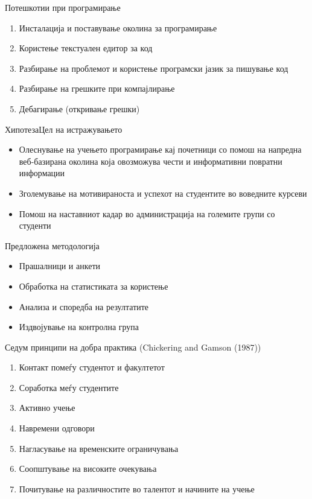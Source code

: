 \begin{frame}{Потешкотии при програмирање}
\begin{enumerate}
  \item Инсталација и поставување околина за програмирање 
  \item Користење текстуален едитор за код
  \item Разбирање на проблемот и користење програмски јазик за пишување код
  \item Разбирање на грешките при компајлирање
  \item Дебагирање (откривање грешки)
\end{enumerate}
\end{frame}

\begin{frame}{Хипотеза}{Цел на истражувањето}
\begin{itemize}
  \item Олеснување на учењето програмирање кај почетници со помош на напредна
  веб-базирана околина која овозможува чести и информативни повратни
  информации
  \item Зголемување на мотивираноста и успехот на студентите во воведните
  курсеви
  \item Помош на наставниот кадар во администрација на големите групи со
  студенти
\end{itemize}
\end{frame}

\begin{frame}{Предложена методологија}
    \begin{itemize}
      \item Прашалници и анкети
      \item Обработка на статистиката за користење
      \item Анализа и споредба на резултатите 
      \item Издвојување на контролна група
    \end{itemize}
    Седум принципи на добра практика (Chickering
and Gamson (1987))
    \begin{enumerate}
      \item Контакт помеѓу студентот и факултетот
      \item Соработка меѓу студентите
      \item Активно учење
      \item Навремени одговори
      \item Нагласување на временските ограничувања
      \item Соопштување на високите очекувања
      \item Почитување на различностите во талентот и начините на учење
    \end{enumerate}
\end{frame}

